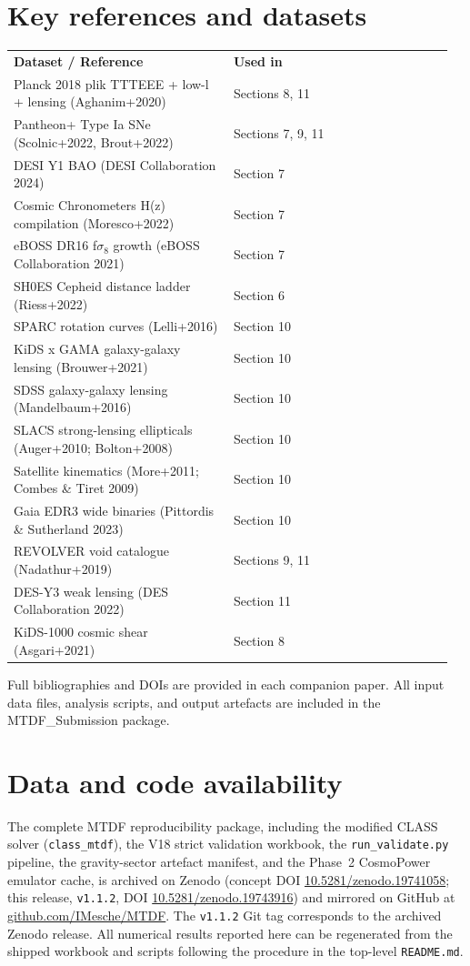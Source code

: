 \documentclass[11pt,a4paper]{article}
\begin{document}
\section{Key references and datasets}
\label{sec:refs}
\begingroup\footnotesize
\begin{longtable}{>{\RaggedRight\arraybackslash}p{0.480\linewidth}>{\RaggedRight\arraybackslash}p{0.480\linewidth}}
\toprule
\endfirsthead
\toprule\endhead
\bottomrule\endfoot
\textbf{Dataset / Reference} & \textbf{Used in} \tabularnewline
Planck 2018 plik TTTEEE + low-l + lensing (Aghanim+2020) & Sections 8, 11 \tabularnewline
Pantheon+ Type Ia SNe (Scolnic+2022, Brout+2022) & Sections 7, 9, 11 \tabularnewline
DESI Y1 BAO (DESI Collaboration 2024) & Section 7 \tabularnewline
Cosmic Chronometers H(z) compilation (Moresco+2022) & Section 7 \tabularnewline
eBOSS DR16 f$\sigma_8$ growth (eBOSS Collaboration 2021) & Section 7 \tabularnewline
SH0ES Cepheid distance ladder (Riess+2022) & Section 6 \tabularnewline
SPARC rotation curves (Lelli+2016) & Section 10 \tabularnewline
KiDS x GAMA galaxy-galaxy lensing (Brouwer+2021) & Section 10 \tabularnewline
SDSS galaxy-galaxy lensing (Mandelbaum+2016) & Section 10 \tabularnewline
SLACS strong-lensing ellipticals (Auger+2010; Bolton+2008) & Section 10 \tabularnewline
Satellite kinematics (More+2011; Combes \& Tiret 2009) & Section 10 \tabularnewline
Gaia EDR3 wide binaries (Pittordis \& Sutherland 2023) & Section 10 \tabularnewline
REVOLVER void catalogue (Nadathur+2019) & Sections 9, 11 \tabularnewline
DES-Y3 weak lensing (DES Collaboration 2022) & Section 11 \tabularnewline
KiDS-1000 cosmic shear (Asgari+2021) & Section 8 \tabularnewline
\end{longtable}
\endgroup

Full bibliographies and DOIs are provided in each companion paper. All input data files, analysis scripts, and output artefacts are included in the MTDF\_\allowbreak{}Submission package.

\section{Data and code availability}
\label{sec:data-availability}
The complete MTDF reproducibility package, including the modified CLASS solver
(\texttt{class\_\allowbreak{}mtdf}), the V18 strict validation workbook, the
\texttt{run\_\allowbreak{}validate.py} pipeline, the gravity-sector artefact
manifest, and the Phase~2 CosmoPower emulator cache, is archived on Zenodo
(concept DOI \href{https://doi.org/10.5281/zenodo.19741058}{10.5281/\allowbreak{}zenodo.\allowbreak{}19741058};
this release, \texttt{v1.1.2}, DOI
\href{https://doi.org/10.5281/zenodo.19743916}{10.5281/\allowbreak{}zenodo.\allowbreak{}19743916})
and mirrored on GitHub at
\href{https://github.com/IMesche/MTDF}{github.com/\allowbreak{}IMesche/\allowbreak{}MTDF}.
The \texttt{v1.1.2} Git tag corresponds to the archived Zenodo release. All
numerical results reported here can be regenerated from the shipped workbook
and scripts following the procedure in the top-level \texttt{README.md}.
\end{document}
